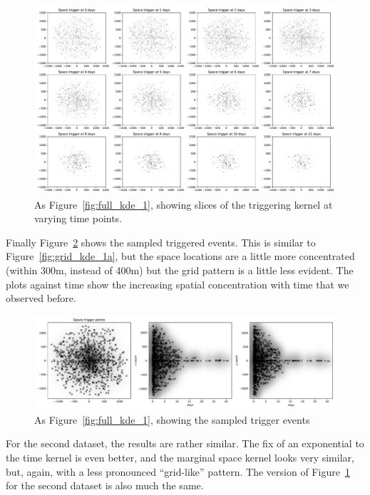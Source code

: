 \documentclass[twoside,a4paper]{article}
\theoremstyle{plain}
\theoremstyle{definition}
\begin{document}
\begin{figure}
  \includegraphics[width=\textwidth]{../notebooks/full_kde_2.pdf}
  \caption{As Figure~\ref{fig:full_kde_1}, showing slices of the triggering kernel at varying time points.}
  \label{fig:full_kde_2}
\end{figure}

Finally Figure~\ref{fig:full_kde_3} shows the sampled triggered events.  This is similar to
Figure~\ref{fig:grid_kde_1a}, but the space locations are a little more concentrated (within 300m,
instead of 400m) but the grid pattern is a little less evident.  The plots against time show the
increasing spatial concentration with time that we observed before.

\begin{figure}
  \includegraphics[width=\textwidth]{../notebooks/full_kde_3.pdf}
  \caption{As Figure~\ref{fig:full_kde_1}, showing the sampled trigger events}
  \label{fig:full_kde_3}
\end{figure}

For the second dataset, the results are rather similar.  The fix of an exponential to the
time kernel is even better, and the marginal space kernel looks very similar, but, again, with
a less pronounced ``grid-like'' pattern.  The version of Figure~\ref{fig:full_kde_2} for the
second dataset is also much the same.  
\end{document}
